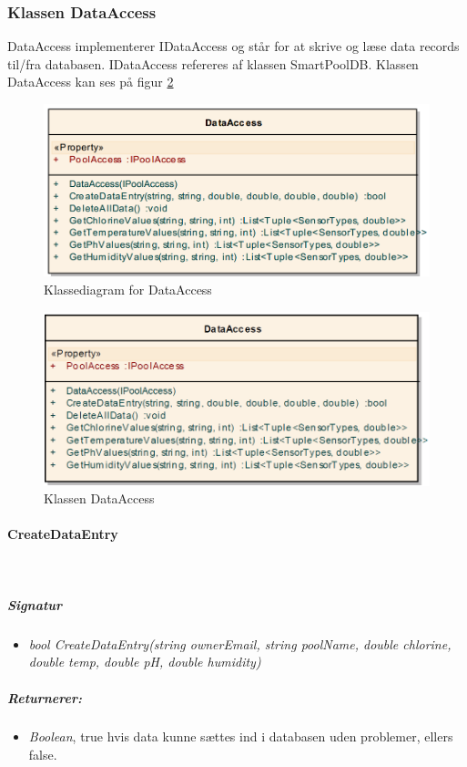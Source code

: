 \subsubsection{Klassen DataAccess}
DataAccess implementerer IDataAccess og står for at skrive og læse data records til/fra databasen.
IDataAccess refereres af klassen SmartPoolDB. Klassen DataAccess kan ses på figur \ref{fig:dataAccessClassNoInherit}

\begin{figure}[H]
\centering
\includegraphics[width=0.7\linewidth]{figs/dbExtra/classdiadata.png}
\caption{Klassediagram for DataAccess}
\label{fig:classdiadata}
\end{figure}


\begin{figure}[H]
\centering
\includegraphics[width=0.7\linewidth]{figs/implementering/dataAccessClassNoInherit}
\caption{Klassen DataAccess}
\label{fig:dataAccessClassNoInherit}
\end{figure}

\paragraph{CreateDataEntry}\ %

\subparagraph{Signatur}
\begin{itemize}
	\item \textit{bool CreateDataEntry(string ownerEmail, string poolName, double chlorine, double temp, double pH, double humidity)}
\end{itemize}

\subparagraph{Returnerer:}
\begin{itemize}
	\item \textit{Boolean}, true hvis data kunne sættes ind i databasen uden problemer, ellers false.
\end{itemize}

